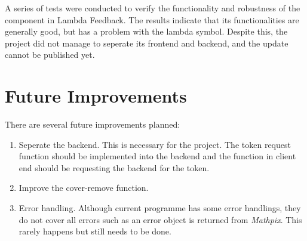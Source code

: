 \documentclass[12pt,twoside]{report}
\begin{document}
A series of tests were conducted to verify the functionality and robustness of
the component in Lambda Feedback. The results indicate that its functionalities
are generally good, but has a problem with the lambda symbol. Despite this, the
project did not manage to seperate its frontend and backend, and the update
cannot be published yet.

\section*{Future Improvements}
There are several future improvements planned:
\begin{enumerate}
    \item Seperate the backend. This is necessary for the project. The token request function should be implemented into the backend and the function in client end should be requesting the backend for the token.
    \item Improve the cover-remove function.
    \item Error handling. Although current programme has some error handlings, they do not cover all errors such as an error object is returned from \textit{Mathpix}. This rarely happens but still needs to be done.
\end{enumerate}



\end{document}
